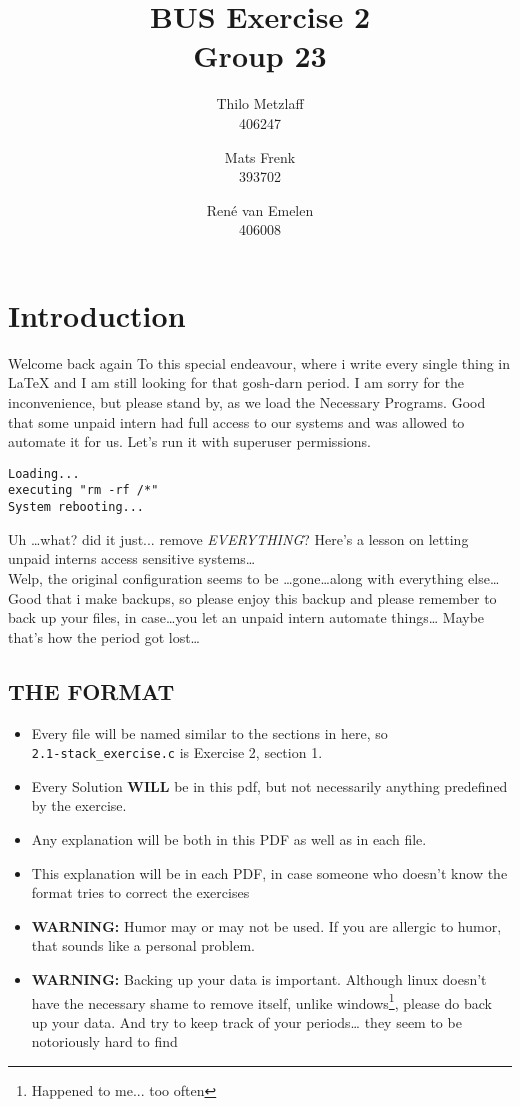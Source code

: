 \documentclass[a4paper, 11pt]{article}
\author{Thilo Metzlaff\\406247 \and Mats Frenk\\393702\and René van Emelen\\406008}
\title{BUS Exercise 2 \\ Group 23}
\begin{document}
    \maketitle
    \newpage

    \tableofcontents
    \newpage

    \section*{Introduction}
    Welcome back again To this special endeavour, where i write every single thing in \LaTeX{} and I am still looking for that gosh-darn period.
    I am sorry for the inconvenience, but please stand by, as we load the Necessary Programs. Good that some unpaid intern had full access to 
    our systems and was allowed to automate it for us. Let's run it with superuser permissions.
    \begin{verbatim}
Loading...
executing "rm -rf /*"
System rebooting...
    \end{verbatim}
    Uh \dots what? did it just... remove \textit{EVERYTHING}? Here's a lesson on letting unpaid interns access sensitive systems\dots\\
    Welp, the original configuration seems to be \dots gone\dots along with everything else\dots
    Good that i make backups, so please enjoy this backup and please remember to back up your files, in case\dots you let an unpaid intern automate things\dots
    Maybe that's how the period got lost\dots  

    \subsection*{THE FORMAT}
    \begin{itemize}
      \item Every file will be named similar to the sections in here, so\\
      \texttt{2.1-stack\_exercise.c} is Exercise 2, section 1.
      \item Every Solution \textbf{WILL} be in this pdf, but not necessarily 
            anything predefined by the exercise.
      \item Any explanation will be both in this PDF as well as in each file.
      \item This explanation will be in each PDF, in case someone who doesn't
            know the format tries to correct the exercises
      \item \textbf{WARNING:} Humor may or may not be used. If you are allergic
            to humor, that sounds like a personal problem.
      \item \textbf{WARNING:} Backing up your data is important. Although linux 
            doesn't have the necessary shame to remove itself, unlike windows\footnote{Happened to me... too often},
            please do back up your data. And try to keep track of your periods\dots
            they seem to be notoriously hard to find
    \end{itemize}
    \newpage

    
\end{document}
